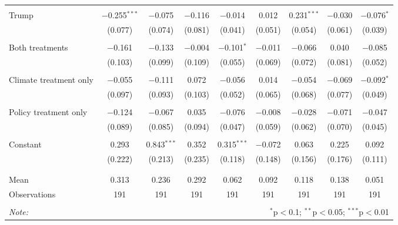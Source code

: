 \begin{tabular}{@{\extracolsep{5pt}}lcccccccc}
  & & & & & & & & \\ 
 Trump & $-$0.255$^{***}$ & $-$0.075 & $-$0.116 & $-$0.014 & 0.012 & 0.231$^{***}$ & $-$0.030 & $-$0.076$^{*}$ \\ 
  & (0.077) & (0.074) & (0.081) & (0.041) & (0.051) & (0.054) & (0.061) & (0.039) \\ 
  & & & & & & & & \\ 
 Both treatments & $-$0.161 & $-$0.133 & $-$0.004 & $-$0.101$^{*}$ & $-$0.011 & $-$0.066 & 0.040 & $-$0.085 \\ 
  & (0.103) & (0.099) & (0.109) & (0.055) & (0.069) & (0.072) & (0.081) & (0.052) \\ 
  & & & & & & & & \\ 
 Climate treatment only & $-$0.055 & $-$0.111 & 0.072 & $-$0.056 & 0.014 & $-$0.054 & $-$0.069 & $-$0.092$^{*}$ \\ 
  & (0.097) & (0.093) & (0.103) & (0.052) & (0.065) & (0.068) & (0.077) & (0.049) \\ 
  & & & & & & & & \\ 
 Policy treatment only & $-$0.124 & $-$0.067 & 0.035 & $-$0.076 & $-$0.008 & $-$0.028 & $-$0.071 & $-$0.047 \\ 
  & (0.089) & (0.085) & (0.094) & (0.047) & (0.059) & (0.062) & (0.070) & (0.045) \\ 
  & & & & & & & & \\ 
 Constant & 0.293 & 0.843$^{***}$ & 0.352 & 0.315$^{***}$ & $-$0.072 & 0.063 & 0.225 & 0.092 \\ 
  & (0.222) & (0.213) & (0.235) & (0.118) & (0.148) & (0.156) & (0.176) & (0.111) \\ 
  & & & & & & & & \\ 
\hline \\[-1.8ex] 
Mean & 0.313 & 0.236 & 0.292 & 0.062 & 0.092 & 0.118 & 0.138 & 0.051 \\ 
Observations & 191 & 191 & 191 & 191 & 191 & 191 & 191 & 191 \\ 
\hline 
\hline \\[-1.8ex] 
\textit{Note:}  & \multicolumn{8}{r}{$^{*}$p$<$0.1; $^{**}$p$<$0.05; $^{***}$p$<$0.01} \\ 
\end{tabular} 

